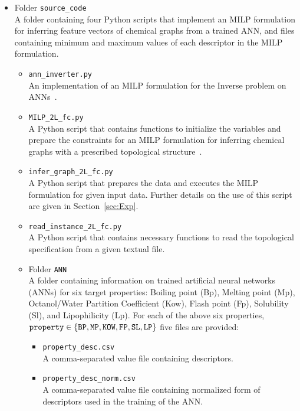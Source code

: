\documentclass[11pt, titlepage, dvipdfmx, twoside]{article}
\begin{document}
\begin{itemize}

\item Folder {\tt source\_code}\\
A folder containing four Python scripts that implement
an MILP formulation for inferring feature vectors
of chemical graphs from a trained ANN,
and files containing minimum and maximum values
of each descriptor in the MILP formulation.

\begin{itemize}

\item {\tt ann\_inverter.py}\\
An implementation of an MILP formulation 
for the Inverse problem on  ANNs~\cite{AN19}.

\item {\tt MILP\_2L\_fc.py}\\
A Python script that contains functions to initialize the variables and prepare 
the constraints for an MILP
formulation for inferring chemical graphs with 
a prescribed topological structure~\cite{cyclic_BH_arxiv}.

\item {\tt infer\_graph\_2L\_fc.py}\\
A Python script that prepares the data and executes 
the MILP formulation for given input data.
Further details on the use of this script
are given in Section~\ref{sec:Exp}.

\item {\tt read\_instance\_2L\_fc.py}\\
A Python script that contains necessary functions
to read the topological specification from a given textual file.

\item Folder {\tt ANN}\\
A folder containing information on trained artificial neural networks (ANNs) for six target properties:
Boiling point (Bp), Melting point (Mp),  Octanol/Water Partition Coefficient (Kow), Flash point (Fp),
Solubility (Sl), and Lipophilicity (Lp).
For each of the above six properties, ${\tt property} \in \{{\tt BP, MP, KOW, FP, SL, LP}\}$ five files are provided:
%
\begin{itemize}
\item {\tt property\_desc.csv}\\
A comma-separated value file containing descriptors.

\item {\tt property\_desc\_norm.csv}\\
A comma-separated value file containing normalized form of descriptors
used in the training of the ANN.


\end{itemize}
\end{itemize}
\end{itemize}
\end{document}
